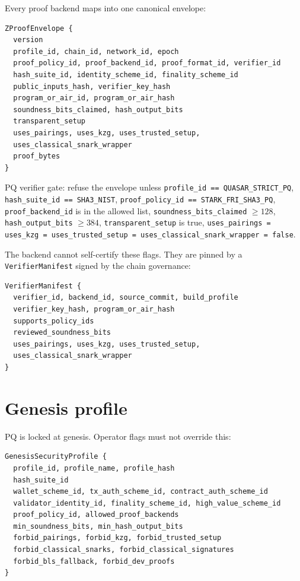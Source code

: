 \documentclass[11pt,a4paper]{article}
\newcommand{\PQ}{\textsf{PQ}}
\begin{document}
Every proof backend maps into one canonical envelope:

\begin{verbatim}
ZProofEnvelope {
  version
  profile_id, chain_id, network_id, epoch
  proof_policy_id, proof_backend_id, proof_format_id, verifier_id
  hash_suite_id, identity_scheme_id, finality_scheme_id
  public_inputs_hash, verifier_key_hash
  program_or_air_id, program_or_air_hash
  soundness_bits_claimed, hash_output_bits
  transparent_setup
  uses_pairings, uses_kzg, uses_trusted_setup,
  uses_classical_snark_wrapper
  proof_bytes
}
\end{verbatim}

\noindent
\PQ{} verifier gate: refuse the envelope unless
\texttt{profile\_id == QUASAR\_STRICT\_PQ},
\texttt{hash\_suite\_id == SHA3\_NIST},
\texttt{proof\_policy\_id == STARK\_FRI\_SHA3\_PQ},
\texttt{proof\_backend\_id} is in the allowed list,
\texttt{soundness\_bits\_claimed} $\geq 128$,
\texttt{hash\_output\_bits} $\geq 384$,
\texttt{transparent\_setup} is true,
\texttt{uses\_pairings = uses\_kzg = uses\_trusted\_setup =
uses\_classical\_snark\_wrapper = false}.

The backend cannot self-certify these flags. They are pinned by a
\texttt{VerifierManifest} signed by the chain governance:

\begin{verbatim}
VerifierManifest {
  verifier_id, backend_id, source_commit, build_profile
  verifier_key_hash, program_or_air_hash
  supports_policy_ids
  reviewed_soundness_bits
  uses_pairings, uses_kzg, uses_trusted_setup,
  uses_classical_snark_wrapper
}
\end{verbatim}

\section{Genesis profile}
\label{sec:genesis}

\PQ{} is locked at genesis. Operator flags must not override
this:

\begin{verbatim}
GenesisSecurityProfile {
  profile_id, profile_name, profile_hash
  hash_suite_id
  wallet_scheme_id, tx_auth_scheme_id, contract_auth_scheme_id
  validator_identity_id, finality_scheme_id, high_value_scheme_id
  proof_policy_id, allowed_proof_backends
  min_soundness_bits, min_hash_output_bits
  forbid_pairings, forbid_kzg, forbid_trusted_setup
  forbid_classical_snarks, forbid_classical_signatures
  forbid_bls_fallback, forbid_dev_proofs
}
\end{verbatim}
\end{document}
